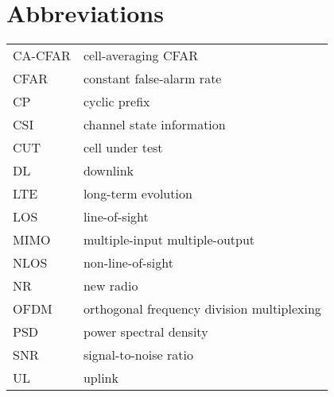 \chapter*{Abbreviations} %

\begin{table}[H]
    \begin{tabular}{ll}
    	CA-CFAR & cell-averaging CFAR \\[2px]
    	CFAR & constant false-alarm rate \\[2px]
    	CP & cyclic prefix \\[2px]
    	CSI & channel state information \\[2px]
    	CUT & cell under test \\[2px]
    	DL & downlink \\[2px]
        LTE & long-term evolution \\[2px]
        LOS & line-of-sight \\[2px]
        MIMO & multiple-input multiple-output \\[2px]
        NLOS & non-line-of-sight \\[2px]
        NR & new radio\\[2px]
        OFDM & orthogonal frequency division multiplexing \\[2px]
        PSD & power spectral density  \\[2px]
        SNR & signal-to-noise ratio \\[2px]
        UL & uplink \\[2px]
        
        
    \end{tabular}
\end{table}